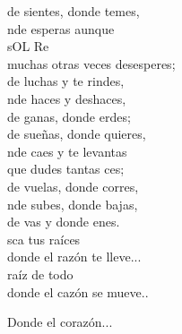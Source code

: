 \begin{cancion}
\begin{chorus}
	\end{chorus}%
	de sientes, donde temes,  \\
	nde esperas aunque \\
       sOL              Re\\
muchas otras veces desesperes; \\
	de luchas y te rindes, \\
	nde haces y deshaces,\\
	de ganas, donde erdes;\\
	de sueñas, donde quieres, \\
	nde caes y te levantas\\
	que dudes tantas ces; \\
	de vuelas, donde corres,\\
	nde subes, donde bajas, \\
	de vas y donde enes. \\
	sca tus raíces \\
	donde el razón te lleve... \\
	 raíz de todo \\
	donde el cazón se mueve.. \jump\\
	\begin{chorus}%
	Donde el corazón...\jump\\
	\end{chorus}%
\end{cancion}%

